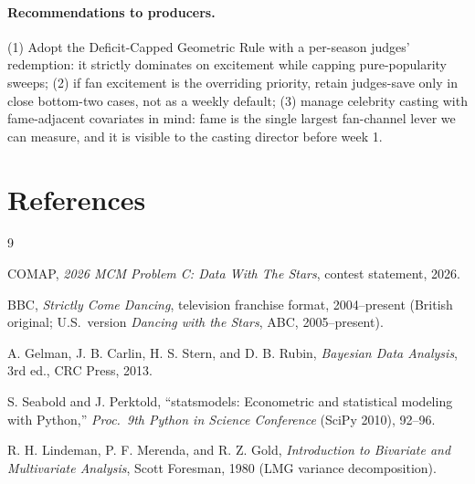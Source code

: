 \documentclass[11pt]{article}
\begin{document}
\paragraph{Recommendations to producers.} (1) Adopt the Deficit-Capped
Geometric Rule with a per-season judges' redemption: it strictly
dominates on excitement while capping pure-popularity sweeps; (2) if
fan excitement is the overriding priority, retain judges-save only in
close bottom-two cases, not as a weekly default; (3) manage celebrity
casting with fame-adjacent covariates in mind: fame is the single
largest fan-channel lever we can measure, and it is visible to the
casting director before week 1.

\section*{References}
\begin{thebibliography}{9}

COMAP, \emph{2026 MCM Problem C: Data With The Stars}, contest
statement, 2026.

BBC, \emph{Strictly Come Dancing}, television franchise format,
2004--present (British original; U.S.\ version \emph{Dancing with the
Stars}, ABC, 2005--present).

A. Gelman, J. B. Carlin, H. S. Stern, and D. B. Rubin,
\emph{Bayesian Data Analysis}, 3rd ed., CRC Press, 2013.

S. Seabold and J. Perktold, ``statsmodels: Econometric and statistical
modeling with Python,'' \emph{Proc.\ 9th Python in Science Conference}
(SciPy 2010), 92--96.

R. H. Lindeman, P. F. Merenda, and R. Z. Gold, \emph{Introduction to
Bivariate and Multivariate Analysis}, Scott Foresman, 1980
(LMG variance decomposition).

\end{thebibliography}
\end{document}
